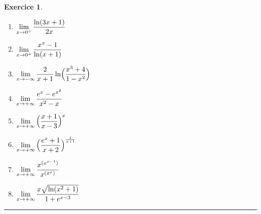 \documentclass[a4paper,11pt]{article}
\theoremstyle{definition}
\newtheorem{exo}{Exercice} %
\begin{document}
\begin{minipage}[t]{1\linewidth}
\begin{minipage}[t]{0.48\linewidth}
\begin{exo}
\begin{enumerate}
		\item $\displaystyle\lim_{x \rightarrow0^+}{\ln(3x+1) \over2x}$
		
		\item $\displaystyle\lim_{x \rightarrow0^+}{x^x-1 \over\ln(x+1)}$
		
		\item $\displaystyle\lim_{x \rightarrow- \infty}{2 \over x+1}\ln
		\Bigl({x^3+4 \over1-x^2}\Bigr)$
		
		
		
		
		
		\item $\displaystyle\lim_{x \rightarrow+ \infty}{e^x-e^{x^2} \over x^2-x}$ 
		
		
		\item $\displaystyle\lim_{x \rightarrow+ \infty}{\Bigl({x+1 \over x-3}\Bigr)^x}$
		
		
		\item $\displaystyle\lim_{x \rightarrow+ \infty}{\Bigl({e^x+1 \over
				x+2}\Bigr)^{1 \over x+1}}$
		
		
		\item $\displaystyle\lim_{x \rightarrow+ \infty}{x^{(x^{x-1})} \over
			x^{(x^{x})}}$
		
		
		\item $\displaystyle\lim_{x \rightarrow+ \infty}{x \sqrt{\ln(x^2+1)} \over
			1+e^{x-3}}$
	\end{enumerate}

			\centering
			\rule{1\linewidth}{0.6pt}
		\end{exo}
		
		
	\end{minipage}
\end{minipage}
\end{document}
